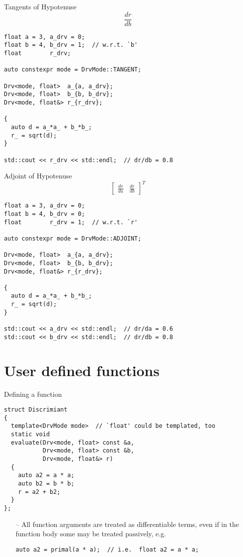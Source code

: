 \documentclass[xcolor=dvipsnames]{beamer}
\begin{document}
\begin{frame}[fragile]{Tangents of Hypotenuse}
\begin{equation*}
  \frac{d r}{d b}
\end{equation*}

\begin{lstlisting}
float a = 3, a_drv = 0;
float b = 4, b_drv = 1;  // w.r.t. `b'
float        r_drv;

auto constexpr mode = DrvMode::TANGENT;

Drv<mode, float>  a_{a, a_drv};
Drv<mode, float>  b_{b, b_drv};
Drv<mode, float&> r_{r_drv};

{
  auto d = a_*a_ + b_*b_;
  r_ = sqrt(d);
}

std::cout << r_drv << std::endl;  // dr/db = 0.8
\end{lstlisting}
\end{frame}


\begin{frame}[fragile]{Adjoint of Hypotenuse}
\begin{equation*}
\begin{bmatrix}
\frac{d r}{d a} & \frac{d r}{d b}
\end{bmatrix}^T
\end{equation*}

\begin{lstlisting}
float a = 3, a_drv = 0;
float b = 4, b_drv = 0;
float        r_drv = 1;  // w.r.t. `r'

auto constexpr mode = DrvMode::ADJOINT;

Drv<mode, float>  a_{a, a_drv};
Drv<mode, float>  b_{b, b_drv};
Drv<mode, float&> r_{r_drv};

{
  auto d = a_*a_ + b_*b_;
  r_ = sqrt(d);
}

std::cout << a_drv << std::endl;  // dr/da = 0.6
std::cout << b_drv << std::endl;  // dr/db = 0.8
\end{lstlisting}
\end{frame}


\section{User defined functions}


\begin{frame}[fragile]{Defining a function}
\begin{lstlisting}
struct Discrimiant
{
  template<DrvMode mode>  // `float' could be templated, too
  static void
  evaluate(Drv<mode, float> const &a,
           Drv<mode, float> const &b,
           Drv<mode, float&> r)
  {
    auto a2 = a * a;
    auto b2 = b * b;
    r = a2 + b2;
  }
};
\end{lstlisting}
\begin{itemize}
\item[--] All function arguments are treated as differentiable terms, even if in the function body some may be treated passively, e.g.
\begin{lstlisting}
auto a2 = primal(a * a);  // i.e.  float a2 = a * a;
\end{lstlisting}
\end{itemize}
\end{frame}
\end{document}
